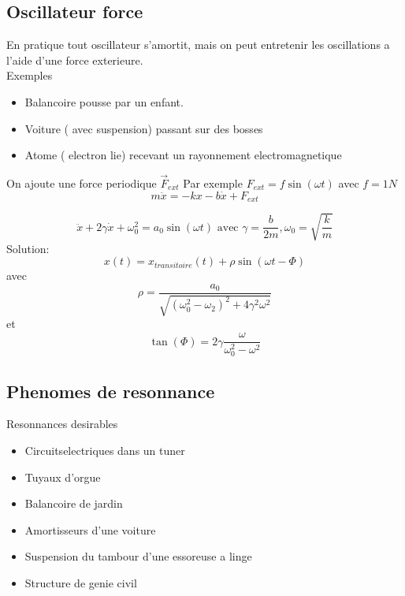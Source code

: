 \documentclass[../main.tex]{subfiles}
\begin{document}
\subsection{Oscillateur force}
En pratique tout oscillateur s'amortit, mais on peut entretenir les oscillations a l'aide d'une force exterieure.\\
Exemples
\begin{itemize}
	\item Balancoire pousse par un enfant.
	\item Voiture ( avec suspension) passant sur des bosses
	\item Atome ( electron lie) recevant un rayonnement electromagnetique
\end{itemize}
On ajoute une force periodique $\vec{F}_{ ext }$ Par exemple $F_{ext}=f \sin(\omega t)$ avec $f=1N$
\[ 
	m \ddot{x}= - kx -b \dot{x} + F_{ext}
\]

\[ 
	\ddot{x} + 2 \gamma \dot{x} + \omega_0^{2} =a_0\sin(\omega t) \text{ avec } \gamma=\frac{b}{2m}, \omega_0=\sqrt{\frac{k}{m}}
\]
Solution:
\[ 
	x(t)= x_{transitoire} ( t) + \rho \sin(\omega t- \Phi)
\]
avec
\[ 
	\rho= \frac{a_0}{\sqrt{(\omega_0^{2}-\omega_2)^{2}+4 \gamma^{2}\omega^{2}}}
\]
et
\[ 
	\tan(\Phi) = 2\gamma\frac{\omega}{\omega_0^{2}-\omega^{2}}
\]

\subsection{Phenomes de resonnance}
Resonnances desirables
\begin{itemize}
	\item Circuitselectriques dans un tuner
	\item Tuyaux d'orgue
	\item Balancoire de jardin
\end{itemize}
\begin{itemize}
	\item Amortisseurs d'une voiture
	\item Suspension du tambour d'une essoreuse a linge
	\item Structure de genie civil
\end{itemize}
\end{document}
